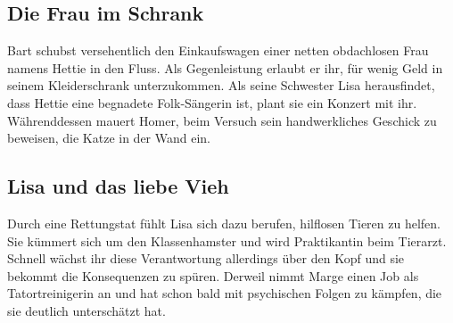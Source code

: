 
\subsection{Die Frau im Schrank}
Bart schubst versehentlich den Einkaufswagen einer netten obdachlosen Frau namens Hettie in den Fluss. Als Gegenleistung erlaubt er ihr, für wenig Geld in seinem Kleiderschrank unterzukommen. Als seine Schwester Lisa herausfindet, dass Hettie eine begnadete Folk-Sängerin ist, plant sie ein Konzert mit ihr. Währenddessen mauert Homer, beim Versuch sein handwerkliches Geschick zu beweisen, die Katze in der Wand ein.


\subsection{Lisa und das liebe Vieh}\label{VABF08}
Durch eine Rettungstat fühlt Lisa sich dazu berufen, hilflosen Tieren zu helfen. Sie kümmert sich um den Klassenhamster und wird Praktikantin beim Tierarzt. Schnell wächst ihr diese Verantwortung allerdings über den Kopf und sie bekommt die Konsequenzen zu spüren. Derweil nimmt Marge einen Job als Tatortreinigerin an und hat schon bald mit psychischen Folgen zu kämpfen, die sie deutlich unterschätzt hat.


